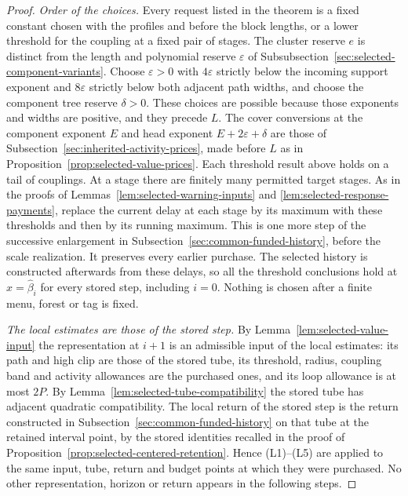 \begin{proof}
\emph{Order of the choices.}
Every request listed in the theorem is a fixed constant chosen with the
profiles and before the block lengths, or a lower threshold for the
coupling at a fixed pair of stages. The cluster reserve $e$ is distinct from the length and polynomial
reserve $\varepsilon$ of Subsubsection~\ref{sec:selected-component-variants}.
Choose $\varepsilon>0$ with $4\varepsilon$ strictly below the incoming
support exponent and $8\varepsilon$ strictly below both adjacent path
widths, and choose the component tree reserve $\delta>0$. These choices
are possible because those exponents and widths are positive, and they
precede $L$. The cover conversions at the component exponent $E$ and
head exponent $E+2\varepsilon+\delta$ are those of
Subsection~\ref{sec:inherited-activity-prices}, made before $L$ as in
Proposition~\ref{prop:selected-value-prices}. Each threshold result
above holds on a tail of couplings. At a stage there are finitely many
permitted target stages. As in the proofs of
Lemmas~\ref{lem:selected-warning-inputs} and
\ref{lem:selected-response-payments}, replace the current delay at each
stage by its maximum with these thresholds and then by its running
maximum. This is one more step of the successive enlargement in
Subsection~\ref{sec:common-funded-history}, before the scale realization.
It preserves every earlier purchase. The selected history is constructed
afterwards from these delays, so all the threshold conclusions hold at
$x=\widehat\beta_i$ for every stored step, including $i=0$. Nothing is
chosen after a finite menu, forest or tag is fixed.

\emph{The local estimates are those of the stored step.}
By Lemma~\ref{lem:selected-value-input} the representation at $i+1$ is
an admissible input of the local estimates: its path and high clip are
those of the stored tube, its threshold, radius, coupling band and
activity allowances are the purchased ones, and its loop allowance is
at most $2P$. By Lemma~\ref{lem:selected-tube-compatibility} the stored
tube has adjacent quadratic compatibility. The local return of the
stored step is the return constructed in
Subsection~\ref{sec:common-funded-history} on that tube at the retained
interval point, by the stored identities recalled in the proof of
Proposition~\ref{prop:selected-centered-retention}. Hence (L1)--(L5)
are applied to the same input, tube, return and budget points at which
they were purchased. No other representation, horizon or return
appears in the following steps.


\end{proof}
